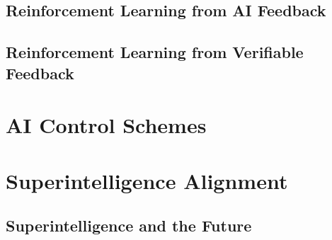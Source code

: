\subsection{Reinforcement Learning from AI Feedback}

\subsection{Reinforcement Learning from Verifiable Feedback}

\section{AI Control Schemes}

\section{Superintelligence Alignment}

\subsection{Superintelligence and the Future}
